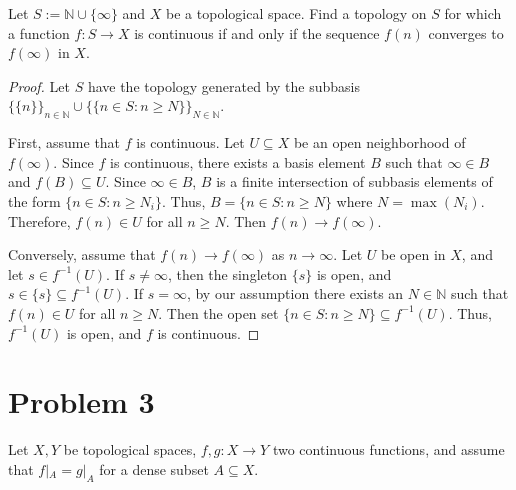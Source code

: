 \documentclass[a4paper,11pt]{article}
\newcommand{\N}{\mathbb{N}}
\newcommand{\inv}[1]{#1^{-1}}
\begin{document}
    Let $S := \N \cup \{\infty\}$ and $X$ be a topological space. Find a topology on $S$ for which a function $f \colon S \to X$ is continuous if and only if the sequence $f(n)$ converges to $f(\infty)$ in $X$.

\begin{proof}
    Let $S$ have the topology generated by the subbasis $\{\{n\}\}_{n \in \N} \cup \{\{n \in S: n \geq N \}\}_{N \in \N}$.

    First, assume that $f$ is continuous. 
    Let $U \subseteq X$ be an open neighborhood of $f(\infty)$. 
    Since $f$ is continuous, there exists a basis element $B$ such that $\infty \in B$ and $f(B) \subseteq U$. 
    Since $\infty \in B$, $B$ is a finite intersection of subbasis elements of the form $\{n \in S : n \geq N_i\}$. 
    Thus, $B = \{n \in S : n \geq N\}$ where $N = \max(N_i)$.
    Therefore, $f(n) \in U$ for all $n \geq N$.
    Then $f(n) \to f(\infty)$. 

    Conversely, assume that $f(n) \to f(\infty)$ as $n \to \infty$. 
    Let $U$ be open in $X$, and let $s \in \inv{f}(U)$. 
    If $s \neq \infty$, then the singleton $\{s\}$ is open, and $s \in \{s\} \subseteq \inv{f}(U)$. 
    If $s = \infty$, by our assumption there exists an $N \in \N$ such that $f(n) \in U$ for all $n \geq N$. 
    Then the open set $\{n \in S: n \geq N \} \subseteq \inv{f}(U)$. 
    Thus, $\inv{f}(U)$ is open, and $f$ is continuous. 

\end{proof}


\section*{Problem 3}
Let $X, Y$ be topological spaces, $f, g \colon X \to Y$ two continuous functions, and assume that $f|_A = g|_A$ for a dense subset $A \subseteq X$.
\end{document}
